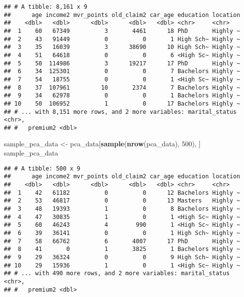 \documentclass[]{article}
\newenvironment{Shaded}{\begin{snugshade}}{\end{snugshade}}
\newcommand{\KeywordTok}[1]{\textcolor[rgb]{0.13,0.29,0.53}{\textbf{#1}}}
\newcommand{\DecValTok}[1]{\textcolor[rgb]{0.00,0.00,0.81}{#1}}
\newcommand{\StringTok}[1]{\textcolor[rgb]{0.31,0.60,0.02}{#1}}
\newcommand{\NormalTok}[1]{#1}
\begin{document}
\begin{verbatim}
## # A tibble: 8,161 x 9
##      age income2 mvr_points old_claim2 car_age education location
##    <dbl>   <dbl>      <dbl>      <dbl>   <dbl> <chr>     <chr>   
##  1    60   67349          3       4461      18 PhD       Highly ~
##  2    43   91449          0          0       1 High Sch~ Highly ~
##  3    35   16039          3      38690      10 High Sch~ Highly ~
##  4    51   64618          0          0       6 <High Sc~ Highly ~
##  5    50  114986          3      19217      17 PhD       Highly ~
##  6    34  125301          0          0       7 Bachelors Highly ~
##  7    54   18755          0          0       1 <High Sc~ Highly ~
##  8    37  107961         10       2374       7 Bachelors Highly ~
##  9    34   62978          0          0       1 Bachelors Highly ~
## 10    50  106952          1          0      17 Bachelors Highly ~
## # ... with 8,151 more rows, and 2 more variables: marital_status <chr>,
## #   premium2 <dbl>
\end{verbatim}

\begin{Shaded}
\begin{Highlighting}[]
\NormalTok{sample_pca_data <-}\StringTok{ }\NormalTok{pca_data[}\KeywordTok{sample}\NormalTok{(}\KeywordTok{nrow}\NormalTok{(pca_data), }\DecValTok{500}\NormalTok{), ]}
\NormalTok{sample_pca_data}
\end{Highlighting}
\end{Shaded}

\begin{verbatim}
## # A tibble: 500 x 9
##      age income2 mvr_points old_claim2 car_age education location
##    <dbl>   <dbl>      <dbl>      <dbl>   <dbl> <chr>     <chr>   
##  1    42   61182          0          0      12 Bachelors Highly ~
##  2    53   46817          0          0      13 Masters   Highly ~
##  3    48   19393          1          0       8 Bachelors Highly ~
##  4    47   30835          1          0       1 <High Sc~ Highly ~
##  5    60   46243          4        990       1 <High Sc~ Highly ~
##  6    39   36141          0          0       1 High Sch~ Highly ~
##  7    58   66762          6       4007      17 PhD       Highly ~
##  8    41       0          1       3825       1 Bachelors Highly ~
##  9    29   36324          0          0       9 High Sch~ Highly ~
## 10    29   15936          1          0       1 <High Sc~ Highly ~
## # ... with 490 more rows, and 2 more variables: marital_status <chr>,
## #   premium2 <dbl>
\end{verbatim}
\end{document}
